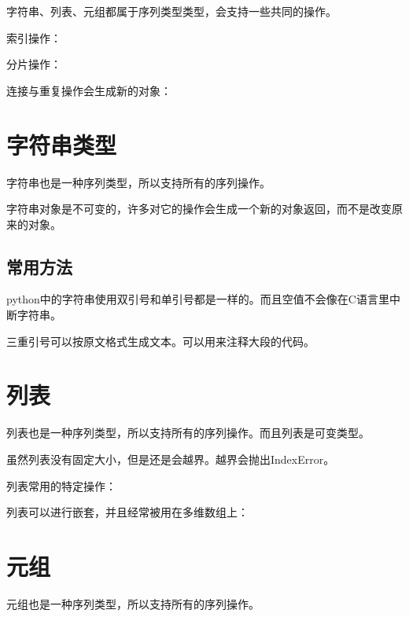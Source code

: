 		字符串、列表、元组都属于序列类型类型，会支持一些共同的操作。

		索引操作：

		

		分片操作：
		

		连接与重复操作会生成新的对象：
		

	\section{字符串类型}

		字符串也是一种序列类型，所以支持所有的序列操作。

		字符串对象是不可变的，许多对它的操作会生成一个新的对象返回，而不是改变原来的对象。

		\subsection{常用方法}

			python中的字符串使用双引号和单引号都是一样的。而且空值不会像在C语言里中断字符串。

			三重引号可以按原文格式生成文本。可以用来注释大段的代码。

			

	\section{列表}

		列表也是一种序列类型，所以支持所有的序列操作。而且列表是可变类型。

		虽然列表没有固定大小，但是还是会越界。越界会抛出IndexError。
		
		列表常用的特定操作：

		

		列表可以进行嵌套，并且经常被用在多维数组上：

		

	\section{元组}

		元组也是一种序列类型，所以支持所有的序列操作。

